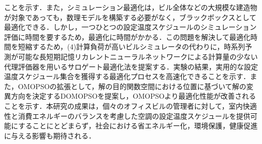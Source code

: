 \documentclass[a4paper, 12pt,dvipdfmx]{jsbook}
\begin{document}
ことを示す．また，シミュレーション最適化は，ビル全体などの大規模な建造物が対象であっても，数理モデルを構築する必要がなく，ブラックボックスとして最適化できる．しかし，一つひとつの設定温度スケジュールのシミュレーション評価に時間を要するため，最適化に時間がかかる．この問題を解決して最適化時間を短縮するため，(4)計算負荷が高いビルシミュレータの代わりに，時系列予測が可能な長短期記憶リカレントニューラルネットワークによる計算量の少ない代理評価器を用いるサロゲート最適化法を提案する．実験の結果，実用的な設定温度スケジュール集合を獲得する最適化プロセスを高速化できることを示す．また，OMOPSOの拡張として，解の目的関数空間における位置に基づいて解の変異方向を決定するDOMOPSOを提案し，OMOPSOより最適化性能が改善されることを示す．本研究の成果は，個々のオフィスビルの管理者に対して，室内快適性と消費エネルギーのバランスを考慮した空調の設定温度スケジュールを提供可能にすることにとどまらず，社会における省エネルギー化，環境保護，健康促進に与える影響も期待される．
\clearpage

\tableofcontents
\listoffigures
\listoftables

\clearpage

\setcounter{page}{1} %











\end{document}

